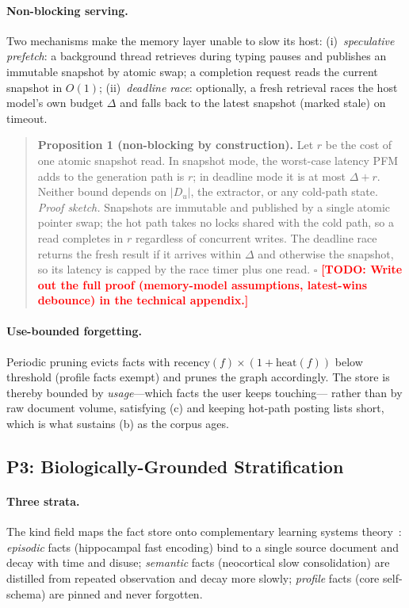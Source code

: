\documentclass[letterpaper]{article}
\newcommand{\todo}[1]{\textbf{\textcolor{red}{[TODO: #1]}}}
\newcommand{\Du}{D_u}
\newcommand{\deadline}{\Delta}
\begin{document}
\paragraph{Non-blocking serving.}
Two mechanisms make the memory layer unable to slow its host:
(i)~\emph{speculative prefetch}: a background thread retrieves during
typing pauses and publishes an immutable snapshot by atomic swap; a
completion request reads the current snapshot in $O(1)$;
(ii)~\emph{deadline race}: optionally, a fresh retrieval races the host
model's own budget $\deadline$ and falls back to the latest snapshot
(marked stale) on timeout.

\begin{quote}
\textbf{Proposition 1 (non-blocking by construction).}
Let $r$ be the cost of one atomic snapshot read. In snapshot mode, the
worst-case latency PFM adds to the generation path is $r$; in deadline
mode it is at most $\deadline + r$. Neither bound depends on $|\Du|$, the
extractor, or any cold-path state.
\emph{Proof sketch.} Snapshots are immutable and published by a single
atomic pointer swap; the hot path takes no locks shared with the cold
path, so a read completes in $r$ regardless of concurrent writes. The
deadline race returns the fresh result if it arrives within $\deadline$
and otherwise the snapshot, so its latency is capped by the race timer
plus one read. $\square$
\todo{Write out the full proof (memory-model assumptions, latest-wins
debounce) in the technical appendix.}
\end{quote}

\paragraph{Use-bounded forgetting.}
Periodic pruning evicts facts with
$\mathrm{recency}(f) \times (1 + \mathrm{heat}(f))$ below threshold
(profile facts exempt) and prunes the graph accordingly. The store is
thereby bounded by \emph{usage}---which facts the user keeps touching---%
rather than by raw document volume, satisfying (c) and keeping hot-path
posting lists short, which is what sustains (b) as the corpus ages.

\subsection{P3: Biologically-Grounded Stratification}

\paragraph{Three strata.}
The $\mathrm{kind}$ field maps the fact store onto complementary learning
systems theory~\citep{mcclelland1995complementary}: \emph{episodic} facts
(hippocampal fast encoding) bind to a single source document and decay
with time and disuse; \emph{semantic} facts (neocortical slow
consolidation) are distilled from repeated observation and decay more
slowly; \emph{profile} facts (core self-schema) are pinned and never
forgotten.
\end{document}
